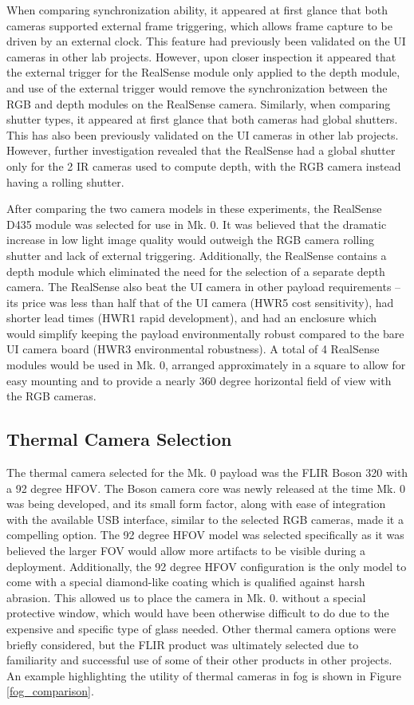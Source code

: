 When comparing synchronization ability, it appeared at first glance that both cameras supported external frame triggering, which allows frame capture to be driven by an external clock. This feature had previously been validated on the UI cameras in other lab projects. However, upon closer inspection it appeared that the external trigger for the RealSense module only applied to the depth module, and use of the external trigger would remove the synchronization between the RGB and depth modules on the RealSense camera. Similarly, when comparing shutter types, it appeared at first glance that both cameras had global shutters. This has also been previously validated on the UI cameras in other lab projects. However, further investigation revealed that the RealSense had a global shutter only for the 2 IR cameras used to compute depth, with the RGB camera instead having a rolling shutter.

After comparing the two camera models in these experiments, the RealSense D435 module was selected for use in Mk. 0. It was believed that the dramatic increase in low light image quality would outweigh the RGB camera rolling shutter and lack of external triggering. Additionally, the RealSense contains a depth module which eliminated the need for the selection of a separate depth camera. The RealSense also beat the UI camera in other payload requirements -- its price was less than half that of the UI camera (HWR5 cost sensitivity), had shorter lead times (HWR1 rapid development), and had an enclosure which would simplify keeping the payload environmentally robust compared to the bare UI camera board (HWR3 environmental robustness). A total of 4 RealSense modules would be used in Mk. 0, arranged approximately in a square to allow for easy mounting and to provide a nearly 360 degree horizontal field of view with the RGB cameras.

\subsection{Thermal Camera Selection}
The thermal camera selected for the Mk. 0 payload was the FLIR Boson 320 with a 92 degree HFOV. The Boson camera core was newly released at the time Mk. 0 was being developed, and its small form factor, along with ease of integration with the available USB interface, similar to the selected RGB cameras, made it a compelling option. The 92 degree HFOV model was selected specifically as it was believed the larger FOV would allow more artifacts to be visible during a deployment. Additionally, the 92 degree HFOV configuration is the only model to come with a special diamond-like coating which is qualified against harsh abrasion. This allowed us to place the camera in Mk. 0. without a special protective window, which would have been otherwise difficult to do due to the expensive and specific type of glass needed. Other thermal camera options were briefly considered, but the FLIR product was ultimately selected due to familiarity and successful use of some of their other products in other projects. An example highlighting the utility of thermal cameras in fog is shown in Figure \ref{fog_comparison}.

